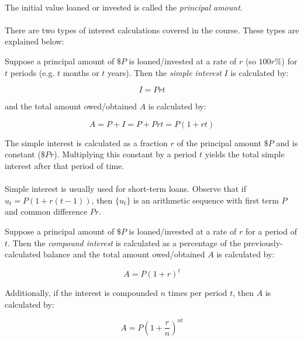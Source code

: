 \documentclass[12pt, a4paper, titlepage, twoside]{article}
\begin{document}
	\paragraph{}
	The initial value loaned or invested is called the \textit{principal amount}.
	
	\paragraph{}
	There are two types of interest calculations covered in the course. These types are explained below:\\
	
	\begin{kp}
		Suppose a principal amount of $\$P$ is loaned/invested at a rate of $r$ (so $100r\%$) for $t$ periods (e.g. $t$ months or 
		$t$ years). Then the \textit{simple interest} $I$ is calculated by:
		
		$$I = Prt$$
		
		and the total amount owed/obtained $A$ is calculated by:
		
		$$A = P + I = P + Prt = P(1+rt)$$
		
		The simple interest is calculated as a fraction $r$ of the principal amount $\$P$ and is constant ($\$Pr$). Multiplying
		this constant by a period $t$ yields the total simple interest after that period of time.
	\end{kp}
	
	\paragraph{}
	Simple interest is usually used for short-term loans. Observe that if $u_t = P(1+r(t-1))$, then $\{u_t\}$ is an arithmetic sequence 
	with first term $P$ and common difference $Pr$.\\
	
	\begin{kp}
		Suppose a principal amount of $\$P$ is loaned/invested at a rate of $r$ for a period of $t$. Then the \textit{compound interest} 
		is calculated as a percentage of the previously-calculated balance and the total amount owed/obtained $A$ is calculated by:
		
		$$A = P(1+r)^t$$
		
		Additionally, if the interest is compounded $n$ times per period $t$, then $A$ is calculated by:
		
		$$A = P\left(1+\frac{r}{n}\right)^{nt}$$
	\end{kp}	
	
\end{document}
